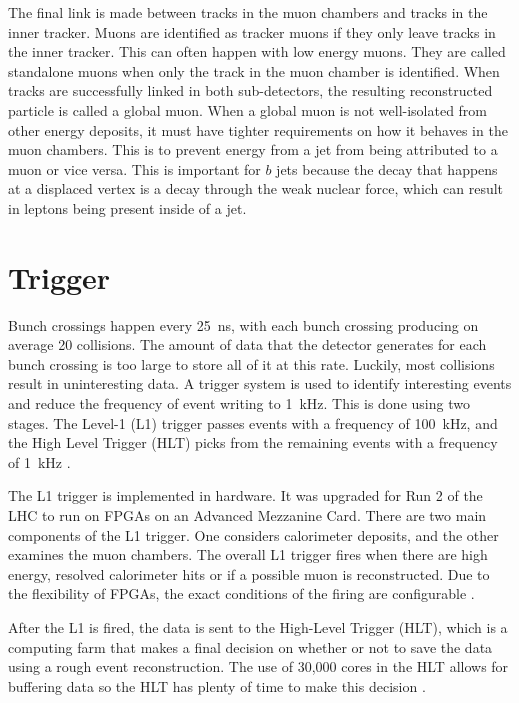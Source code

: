 The final link is made between tracks in the muon chambers and tracks in the inner tracker.
Muons are identified as tracker muons if they only leave tracks in the inner tracker.
This can often happen with low energy muons.
They are called standalone muons when only the track in the muon chamber is identified.
When tracks are successfully linked in both sub-detectors,
the resulting reconstructed particle is called a global muon.
When a global muon is not well-isolated from other energy deposits,
it must have tighter requirements on how it behaves in the muon chambers.
This is to prevent energy from a jet from being attributed to a muon or vice versa.
This is important for $b$ jets because the decay that happens at a displaced vertex
is a decay through the weak nuclear force,
which can result in leptons being present inside of a jet.

\section{Trigger} \label{sec:trigger}

Bunch crossings happen every \SI{25}{ns},
with each bunch crossing producing on average 20 collisions.
The amount of data that the detector generates for each bunch crossing is
too large to store all of it at this rate.
Luckily, most collisions result in uninteresting data.
A trigger system is used to identify interesting events
and reduce the frequency of event writing to \SI{1}{kHz}.
This is done using two stages.
The Level-1 (L1) trigger passes events with a frequency of \SI{100}{kHz},
and the High Level Trigger (HLT) picks from the remaining events
with a frequency of \SI{1}{kHz} \cite{Tosi:2290106}.

The L1 trigger is implemented in hardware.
It was upgraded for Run 2 of the LHC to run on FPGAs on an Advanced Mezzanine Card.
There are two main components of the L1 trigger.
One considers calorimeter deposits, and the other examines the muon chambers.
The overall L1 trigger fires when there are high energy, resolved calorimeter hits
or if a possible muon is reconstructed.
Due to the flexibility of FPGAs,
the exact conditions of the firing are configurable \cite{Cadamuro_2017}.

After the L1 is fired, the data is sent to the High-Level Trigger (HLT),
which is a computing farm that makes a final decision on whether or not to save the data
using a rough event reconstruction.
The use of 30,000 cores in the HLT allows for buffering data
so the HLT has plenty of time to make this decision \cite{Sert:2712275}.

